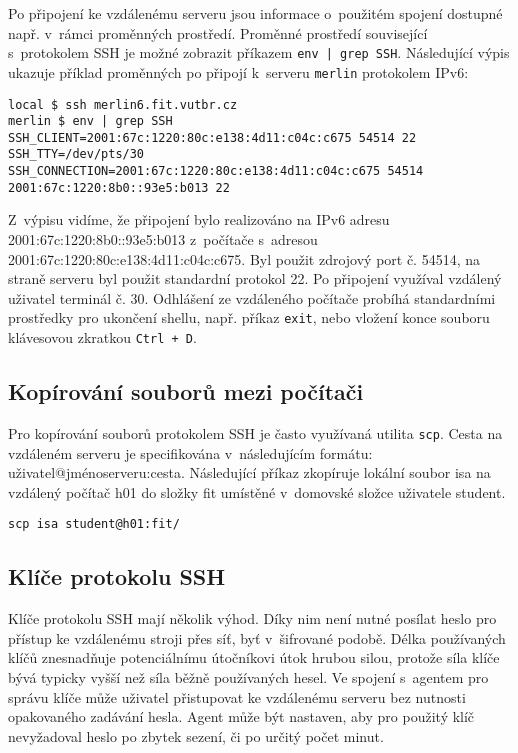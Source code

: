 Po připojení ke vzdálenému serveru jsou informace o~použitém spojení dostupné např. v~rámci proměnných prostředí. Proměnné prostředí související s~protokolem SSH je možné zobrazit
příkazem {\tt env | grep SSH}. Následující výpis ukazuje příklad proměnných po připojí k~serveru {\tt merlin} protokolem IPv6:

\begin{verbatim}
local $ ssh merlin6.fit.vutbr.cz 
merlin $ env | grep SSH
SSH_CLIENT=2001:67c:1220:80c:e138:4d11:c04c:c675 54514 22
SSH_TTY=/dev/pts/30
SSH_CONNECTION=2001:67c:1220:80c:e138:4d11:c04c:c675 54514 2001:67c:1220:8b0::93e5:b013 22
\end{verbatim}

Z~výpisu vidíme, že připojení bylo realizováno na IPv6 adresu 2001:67c:1220:8b0::93e5:b013 z~počítače s~adresou 2001:67c:1220:80c:e138:4d11:c04c:c675. Byl použit zdrojový port č.
54514, na straně serveru byl použit standardní protokol 22. Po připojení využíval vzdálený uživatel terminál č. 30. Odhlášení ze vzdáleného počítače probíhá standardními
prostředky pro ukončení shellu, např. příkaz {\tt exit}, nebo vložení konce souboru klávesovou zkratkou {\tt Ctrl + D}.

\subsection{Kopírování souborů mezi počítači}

Pro kopírování souborů protokolem SSH je často využívaná utilita {\tt scp}. Cesta na vzdáleném serveru je specifikována v~následujícím formátu: uživatel@jménoserveru:cesta.
Následující příkaz zkopíruje lokální soubor isa na vzdálený počítač h01 do složky fit umístěné v~domovské složce uživatele student.

\begin{verbatim}
scp isa student@h01:fit/
\end{verbatim}

\subsection{Klíče protokolu SSH}

Klíče protokolu SSH mají několik výhod. Díky nim není nutné posílat heslo pro přístup ke vzdálenému stroji přes síť, byť v~šifrované podobě. Délka používaných klíčů znesnadňuje
potenciálnímu útočníkovi útok hrubou silou, protože síla klíče bývá typicky vyšší než síla běžně používaných hesel. Ve spojení s~agentem pro správu klíče může uživatel přistupovat ke
vzdálenému serveru bez nutnosti opakovaného zadávání hesla. Agent může být nastaven, aby pro použitý klíč nevyžadoval heslo po zbytek sezení, či po určitý počet minut.

